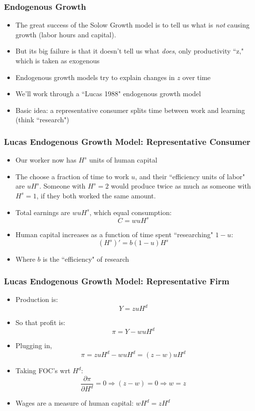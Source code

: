 \documentclass{beamer}
\begin{document}
\begin{frame}
\frametitle[alignment=center]{Endogenous Growth}
\begin{itemize}
\item The great success of the Solow Growth model is to tell us what is \emph{not} causing growth (labor hours and capital).
\bigskip
\item But its big failure is that it doesn't tell us what \emph{does}, only productivity ``z," which is taken as exogenous
\bigskip
\item Endogenous growth models try to explain changes in $z$ over time
\bigskip
\item We'll work through a ``Lucas 1988" endogenous growth model
\bigskip
\item Basic idea:  a representative consumer splits time between work and learning (think ``research")
\end{itemize}
\end{frame}


\begin{frame}
\frametitle[alignment=center]{Lucas Endogenous Growth Model: Representative Consumer}
\begin{itemize}
\item Our worker now has $H^s$ units of human capital
\bigskip
\item The choose a fraction of time to work $u$, and their ``efficiency units of labor" are $uH^s$.  Someone with $H^s=2$ would produce twice as much as someone with $H^s=1$, if they both worked the same amount.
\bigskip
\item Total earnings are $wuH^s$, which equal consumption:
$$C=wuH^s$$
\item Human capital increases as a function of time spent ``researching" $1-u$:
$$(H^s)'=b(1-u)H^s$$
\item Where $b$ is the ``efficiency" of research 
\end{itemize}
\end{frame}

\begin{frame}
\frametitle[alignment=center]{Lucas Endogenous Growth Model: Representative Firm}
\begin{itemize}
\item Production is:
$$Y=zuH^d$$
\item So that profit is:
$$\pi=Y-wuH^d$$
\item Plugging in,
$$\pi=zuH^d-wuH^d=(z-w)uH^d$$
\item Taking FOC's wrt $H^d$:
$$\frac{\partial \pi }{\partial H^d}=0\Rightarrow (z-w)=0\Rightarrow w=z$$
\item Wages are a measure of human capital: $wH^d=zH^d$
\end{itemize}
\end{frame}
\end{document}
